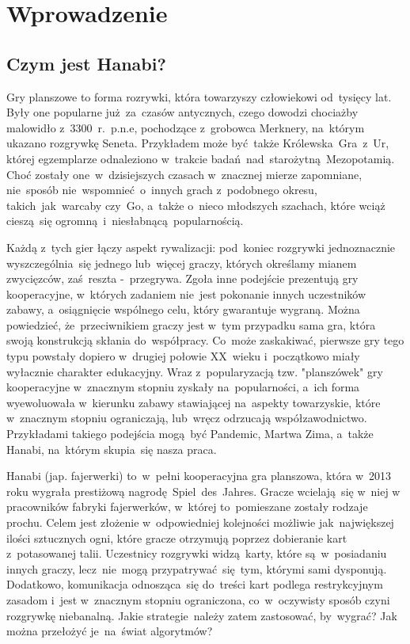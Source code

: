 \documentclass[declaration,shortabstract,inz]{iithesis}
\author         {Wojciech Jarząbek \and
				Jacek Leja}
\begin{document}
\chapter{Wprowadzenie}

\section{Czym jest Hanabi?}

Gry planszowe to forma rozrywki, która towarzyszy człowiekowi od~tysięcy lat. Były one popularne już za~czasów antycznych, czego dowodzi chociażby malowidło z~3300~r.~p.n.e, pochodzące z~grobowca Merknery, na~którym ukazano rozgrywkę Seneta. Przykładem może być także Królewska~Gra~z~Ur, której egzemplarze odnaleziono w~trakcie badań nad~starożytną Mezopotamią. Choć zostały one~w~dzisiejszych czasach w~znacznej mierze zapomniane, nie~sposób nie~wspomnieć o~innych grach z~podobnego okresu, takich~jak~warcaby czy~Go, a~także o~nieco młodszych szachach, które wciąż cieszą~się ogromną i~niesłabnącą popularnością.

Każdą z~tych gier łączy aspekt rywalizacji: pod~koniec rozgrywki jednoznacznie wyszczególnia~się jednego lub~więcej graczy, których określamy mianem zwycięzców, zaś~reszta -~przegrywa. Zgoła inne podejście prezentują gry kooperacyjne, w~których zadaniem nie~jest pokonanie innych uczestników zabawy, a~osiągnięcie wspólnego celu, który gwarantuje wygraną. Można powiedzieć, że~przeciwnikiem graczy jest w~tym przypadku sama gra, która swoją konstrukcją skłania do~współpracy. Co~może zaskakiwać, pierwsze gry tego typu powstały dopiero w~drugiej połowie XX~wieku i~początkowo miały wyłacznie charakter edukacyjny. Wraz z~popularyzacją tzw. "planszówek" gry kooperacyjne w~znacznym stopniu zyskały na~popularności, a~ich forma wyewoluowała w~kierunku zabawy stawiającej na~aspekty towarzyskie, które w~znacznym stopniu ograniczają, lub~wręcz odrzucają współzawodnictwo. Przykładami takiego podejścia mogą~być Pandemic, Martwa Zima, a~także Hanabi, na~którym skupia~się nasza praca.

Hanabi (jap. fajerwerki) to~w~pełni kooperacyjna gra planszowa, która w~2013 roku wygrała prestiżową nagrodę Spiel~des~Jahres. Gracze wcielają~się w~niej w pracowników fabryki fajerwerków, w~której to~pomieszane zostały rodzaje prochu. Celem jest złożenie w~odpowiedniej kolejności możliwie jak~największej ilości sztucznych ogni, które gracze otrzymują poprzez dobieranie kart z~potasowanej talii. Uczestnicy rozgrywki widzą karty, które są~w~posiadaniu innych graczy, lecz~nie~mogą przypatrywać~się~tym, którymi sami dysponują. Dodatkowo, komunikacja odnosząca~się do~treści kart podlega restrykcyjnym zasadom i~jest w~znacznym stopniu ograniczona, co~w~oczywisty sposób czyni rozgrywkę niebanalną. Jakie strategie należy zatem zastosować, by~wygrać? Jak można przełożyć je~na~świat algorytmów?
\end{document}
